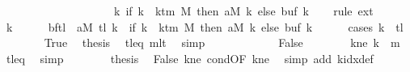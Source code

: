 \begin{isabellebody}
\ \ \ \ \ \ \ \ \ \ \ \ \ \ \ \ \ \ \ {\isacharequal}{\kern0pt}\ {\isacharparenleft}{\kern0pt}{\isasymlambda}k{\isachardot}{\kern0pt}\ if\ k\ {\isacharless}{\kern0pt}\ k{\isacharunderscore}{\kern0pt}tm\ M\ then\ {\isacharquery}{\kern0pt}aM\ k\ else\ buf{}\ k{\isacharparenright}{\kern0pt}{\isachardoublequoteclose}\isanewline
\ \ \isamarkupfalse%
\ {\isacharparenleft}{\kern0pt}rule\ ext{\isacharparenright}{\kern0pt}\isanewline
\ \ \ \ \isamarkupfalse%
\ k\isanewline
\ \ \ \ \isamarkupfalse%
\ {\isachardoublequoteopen}{\isacharparenleft}{\kern0pt}{\isacharquery}{\kern0pt}bf{\isacharparenleft}{\kern0pt}{\isacharquery}{\kern0pt}tl\ {\isacharcolon}{\kern0pt}{\isacharequal}{\kern0pt}\ {\isacharquery}{\kern0pt}aM\ {\isacharquery}{\kern0pt}tl{\isacharparenright}{\kern0pt}{\isacharparenright}{\kern0pt}\ k\ {\isacharequal}{\kern0pt}\ {\isacharparenleft}{\kern0pt}if\ k\ {\isacharless}{\kern0pt}\ k{\isacharunderscore}{\kern0pt}tm\ M\ then\ {\isacharquery}{\kern0pt}aM\ k\ else\ buf{}\ k{\isacharparenright}{\kern0pt}{\isachardoublequoteclose}\isanewline
\ \ \ \ \isamarkupfalse%
\ {\isacharparenleft}{\kern0pt}cases\ {\isachardoublequoteopen}k\ {\isacharequal}{\kern0pt}\ {\isacharquery}{\kern0pt}tl{\isachardoublequoteclose}{\isacharparenright}{\kern0pt}\isanewline
\ \ \ \ \ \ \isamarkupfalse%
\ True\ \isamarkupfalse%
\ {\isacharquery}{\kern0pt}thesis\ \isamarkupfalse%
\ tl{\isacharunderscore}{\kern0pt}eq\ m{}lt\ \isamarkupfalse%
\ simp\isanewline
\ \ \ \ \isamarkupfalse%
\isanewline
\ \ \ \ \ \ \isamarkupfalse%
\ False\isanewline
\ \ \ \ \ \ \isamarkupfalse%
\ kne{\isacharcolon}{\kern0pt}\ {\isachardoublequoteopen}k\ {\isasymnoteq}\ {\isacharquery}{\kern0pt}m{}{\isachardoublequoteclose}\ \isamarkupfalse%
\ tl{\isacharunderscore}{\kern0pt}eq\ \isamarkupfalse%
\ simp\isanewline
\ \ \ \ \ \ \isamarkupfalse%
\ {\isacharquery}{\kern0pt}thesis\ \isamarkupfalse%
\ False\ kne\ cond{\isacharbrackleft}{\kern0pt}OF\ kne{\isacharbrackright}{\kern0pt}\ \isamarkupfalse%
\ {\isacharparenleft}{\kern0pt}simp\ add{\isacharcolon}{\kern0pt}\ k{\isacharunderscore}{\kern0pt}idx{\isacharunderscore}{\kern0pt}def{\isacharparenright}{\kern0pt}\isanewline
\ \ \ \ \isamarkupfalse%
\isanewline
\ \ \isamarkupfalse%

\end{isabellebody}
